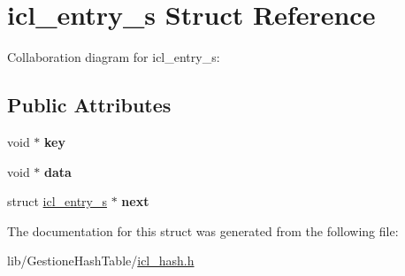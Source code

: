 \hypertarget{structicl__entry__s}{}\section{icl\+\_\+entry\+\_\+s Struct Reference}
\label{structicl__entry__s}


Collaboration diagram for icl\+\_\+entry\+\_\+s\+:
\subsection*{Public Attributes}
\begin{DoxyCompactItemize}
\item 
\mbox{\label{structicl__entry__s_a175ddfefe49a8f6fa16155e58c39c88e}} 
void $\ast$ {\bfseries key}
\item 
\mbox{\label{structicl__entry__s_ac01964f2d85fcdbaa2d16c78fb1a99d6}} 
void $\ast$ {\bfseries data}
\item 
\mbox{\label{structicl__entry__s_af5bc67953f51e75cf74066d616f3420c}} 
struct \hyperlink{structicl__entry__s}{icl\+\_\+entry\+\_\+s} $\ast$ {\bfseries next}
\end{DoxyCompactItemize}


The documentation for this struct was generated from the following file\+:\begin{DoxyCompactItemize}
\item 
lib/\+Gestione\+Hash\+Table/\hyperlink{icl__hash_8h}{icl\+\_\+hash.\+h}\end{DoxyCompactItemize}
